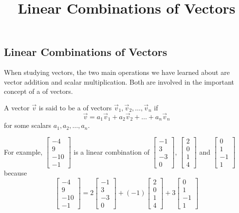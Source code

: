 \documentclass{ximera}
\title{Linear Combinations of Vectors} \license{CC BY-NC-SA 4.0}
\begin{document}
\begin{abstract}
 \end{abstract}
\maketitle

\begin{onlineOnly}
\section*{Linear Combinations of Vectors}
\end{onlineOnly}

When studying vectors, the two main operations we have learned about are vector addition and scalar multiplication.  Both are involved in the important concept of a  of vectors.

\begin{definition}\label{def:lincomb}
A vector $\vec{v}$ is said to be a  of vectors $\vec{v}_1, \vec{v}_2,\ldots, \vec{v}_n$ if 
$$\vec{v}=a_1\vec{v}_1+ a_2\vec{v}_2+\ldots + a_n\vec{v}_n$$
for some scalars $a_1, a_2, \ldots ,a_n$.
\end{definition}
For example, $\begin{bmatrix} -4\\9\\-10\\-1\end{bmatrix}$ is a linear combination of $\begin{bmatrix} -1\\3\\-3\\0\end{bmatrix}$,
$\begin{bmatrix} 2\\0\\1\\4\end{bmatrix}$ and $\begin{bmatrix} 0\\1\\-1\\1\end{bmatrix}$ because 
$$\begin{bmatrix} -4\\9\\-10\\-1\end{bmatrix}=2\begin{bmatrix} -1\\3\\-3\\0\end{bmatrix}+(-1)\begin{bmatrix} 2\\0\\1\\4\end{bmatrix}+3\begin{bmatrix} 0\\1\\-1\\1\end{bmatrix}$$
\end{document}
